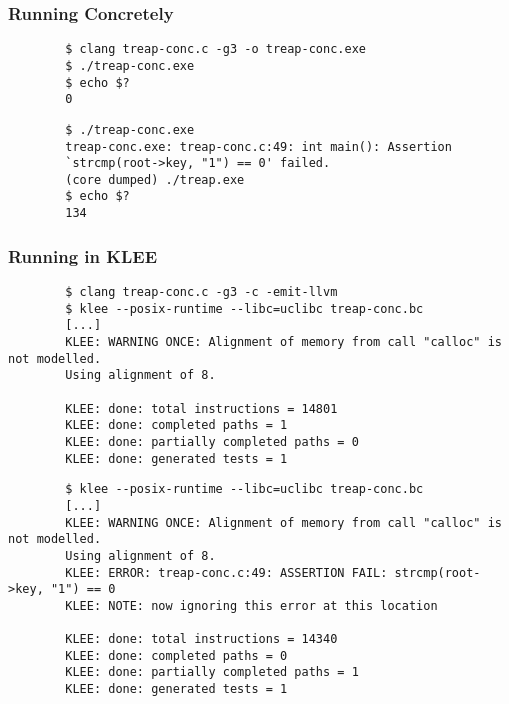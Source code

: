 \documentclass{beamer}
\begin{document}
\begin{frame}[fragile]
	\frametitle{Running Concretely}
	\begin{verbatim}
		$ clang treap-conc.c -g3 -o treap-conc.exe
		$ ./treap-conc.exe
		$ echo $?
		0
	\end{verbatim}
	\pause%
	\begin{verbatim}
		$ ./treap-conc.exe
		treap-conc.exe: treap-conc.c:49: int main(): Assertion
		`strcmp(root->key, "1") == 0' failed.
		(core dumped) ./treap.exe
		$ echo $?
		134
	\end{verbatim}
\end{frame}

\begin{frame}[fragile]
	\frametitle{Running in KLEE}
	\begin{verbatim}
		$ clang treap-conc.c -g3 -c -emit-llvm
		$ klee --posix-runtime --libc=uclibc treap-conc.bc
		[...]
		KLEE: WARNING ONCE: Alignment of memory from call "calloc" is not modelled.
		Using alignment of 8.

		KLEE: done: total instructions = 14801
		KLEE: done: completed paths = 1
		KLEE: done: partially completed paths = 0
		KLEE: done: generated tests = 1
	\end{verbatim}
	\pause%
	\begin{verbatim}
		$ klee --posix-runtime --libc=uclibc treap-conc.bc
		[...]
		KLEE: WARNING ONCE: Alignment of memory from call "calloc" is not modelled.
		Using alignment of 8.
		KLEE: ERROR: treap-conc.c:49: ASSERTION FAIL: strcmp(root->key, "1") == 0
		KLEE: NOTE: now ignoring this error at this location

		KLEE: done: total instructions = 14340
		KLEE: done: completed paths = 0
		KLEE: done: partially completed paths = 1
		KLEE: done: generated tests = 1
	\end{verbatim}
\end{frame}
\end{document}
